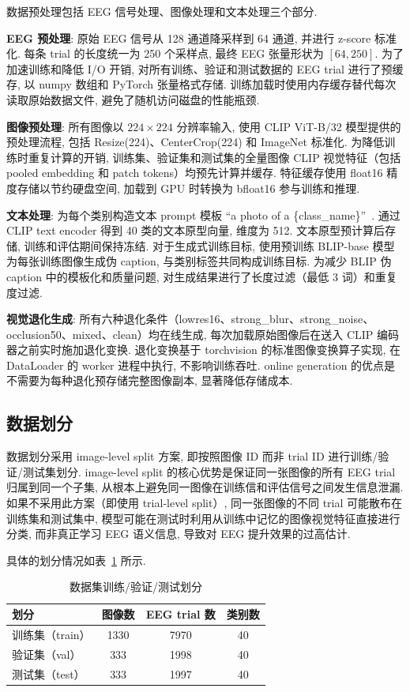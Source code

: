 数据预处理包括 EEG 信号处理、图像处理和文本处理三个部分.

\textbf{EEG 预处理}: 原始 EEG 信号从 128 通道降采样到 64 通道, 并进行 z-score 标准化. 每条 trial 的长度统一为 250 个采样点, 最终 EEG 张量形状为 $[64, 250]$. 为了加速训练和降低 I/O 开销, 对所有训练、验证和测试数据的 EEG trial 进行了预缓存, 以 numpy 数组和 PyTorch 张量格式存储. 训练加载时使用内存缓存替代每次读取原始数据文件, 避免了随机访问磁盘的性能瓶颈.

\textbf{图像预处理}: 所有图像以 $224\times224$ 分辨率输入, 使用 CLIP ViT-B/32 模型提供的预处理流程, 包括 Resize(224)、CenterCrop(224) 和 ImageNet 标准化. 为降低训练时重复计算的开销, 训练集、验证集和测试集的全量图像 CLIP 视觉特征（包括 pooled embedding 和 patch tokens）均预先计算并缓存. 特征缓存使用 float16 精度存储以节约硬盘空间, 加载到 GPU 时转换为 bfloat16 参与训练和推理.

\textbf{文本处理}: 为每个类别构造文本 prompt 模板 ``a photo of a \{class\_name\}''~\cite{radford2021learning}. 通过 CLIP text encoder 得到 40 类的文本原型向量, 维度为 512. 文本原型预计算后存储, 训练和评估期间保持冻结. 对于生成式训练目标, 使用预训练 BLIP-base 模型为每张训练图像生成伪 caption, 与类别标签共同构成训练目标. 为减少 BLIP 伪 caption 中的模板化和质量问题, 对生成结果进行了长度过滤（最低 3 词）和重复度过滤.

\textbf{视觉退化生成}: 所有六种退化条件（lowres16、strong\_blur、strong\_noise、occlusion50、mixed、clean）均在线生成, 每次加载原始图像后在送入 CLIP 编码器之前实时施加退化变换. 退化变换基于 torchvision 的标准图像变换算子实现, 在 DataLoader 的 worker 进程中执行, 不影响训练吞吐. online generation 的优点是不需要为每种退化预存储完整图像副本, 显著降低存储成本.

\subsection{数据划分}

数据划分采用 image-level split 方案, 即按照图像 ID 而非 trial ID 进行训练/验证/测试集划分. image-level split 的核心优势是保证同一张图像的所有 EEG trial 归属到同一个子集, 从根本上避免同一图像在训练信和评估信号之间发生信息泄漏. 如果不采用此方案（即使用 trial-level split）, 同一张图像的不同 trial 可能散布在训练集和测试集中, 模型可能在测试时利用从训练中记忆的图像视觉特征直接进行分类, 而非真正学习 EEG 语义信息, 导致对 EEG 提升效果的过高估计.

具体的划分情况如表~\ref{tab:split} 所示.

\begin{table}[H]
  \centering
  \caption{数据集训练/验证/测试划分}
  \label{tab:split}
  \begin{tabular}{l c c c}
    \toprule
    划分 & 图像数 & EEG trial 数 & 类别数 \\
    \midrule
    训练集（train）& 1330 & 7970 & 40 \\
    验证集（val）& 333 & 1998 & 40 \\
    测试集（test）& 333 & 1997 & 40 \\
    \bottomrule
  \end{tabular}
\end{table}

